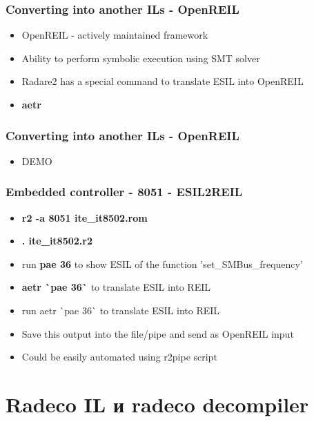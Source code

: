 \documentclass[10pt,pdf,utf8,english,compress,hyperref={unicode}]{beamer}
\begin{document}
\begin{frame}[fragile]
  \frametitle{Converting into another ILs - OpenREIL}
     \begin{itemize}
        \item OpenREIL - actively maintained framework
		\item Ability to perform symbolic execution using SMT solver
		\item Radare2 has a special command to translate ESIL into OpenREIL
		\item \alert{\bf{aetr}}
      \end{itemize}
\end{frame}

\begin{frame}[fragile]
  \frametitle{Converting into another ILs - OpenREIL}
     \begin{itemize}
        \item DEMO
      \end{itemize}
\end{frame}

\begin{frame}[fragile]
  \frametitle{Embedded controller - 8051 - ESIL2REIL}
  \begin{itemize}
	  \item \alert{\bf{r2 -a 8051 ite\_it8502.rom}}
	  \item \alert{\bf{. ite\_it8502.r2}}
	  \item run \alert{\bf{pae 36}} to show ESIL of the function 'set\_SMBus\_frequency'
\ifxetex
	  \item \alert{\bf{aetr \`{}pae 36\`}} to translate ESIL into REIL
\else
	  \item run aetr \`{}pae 36\`{} to translate ESIL into REIL
\fi
	  \item Save this output into the file/pipe and send as OpenREIL input
	  \item Could be easily automated using r2pipe script
  \end{itemize}
\end{frame}

\section{Radeco IL и radeco decompiler}
\end{document}
